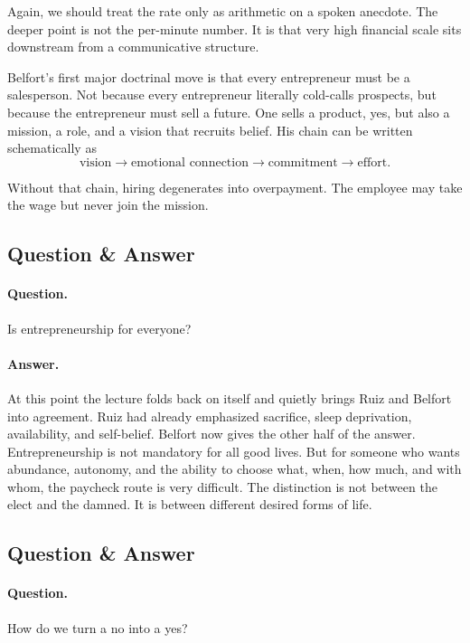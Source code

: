 Again, we should treat the rate only as arithmetic on a spoken anecdote. The deeper point is not the per-minute number. It is that very high financial scale sits downstream from a communicative structure.

Belfort's first major doctrinal move is that every entrepreneur must be a salesperson. Not because every entrepreneur literally cold-calls prospects, but because the entrepreneur must sell a future. One sells a product, yes, but also a mission, a role, and a vision that recruits belief. His chain can be written schematically as
\begin{equation}
\text{vision} \longrightarrow \text{emotional connection} \longrightarrow \text{commitment} \longrightarrow \text{effort}.
\end{equation}

Without that chain, hiring degenerates into overpayment. The employee may take the wage but never join the mission.

\subsection{Question \& Answer}

\paragraph{Question.}
Is entrepreneurship for everyone?

\paragraph{Answer.}
At this point the lecture folds back on itself and quietly brings Ruiz and Belfort into agreement. Ruiz had already emphasized sacrifice, sleep deprivation, availability, and self-belief. Belfort now gives the other half of the answer. Entrepreneurship is not mandatory for all good lives. But for someone who wants abundance, autonomy, and the ability to choose what, when, how much, and with whom, the paycheck route is very difficult. The distinction is not between the elect and the damned. It is between different desired forms of life.

\subsection{Question \& Answer}

\paragraph{Question.}
How do we turn a no into a yes?

